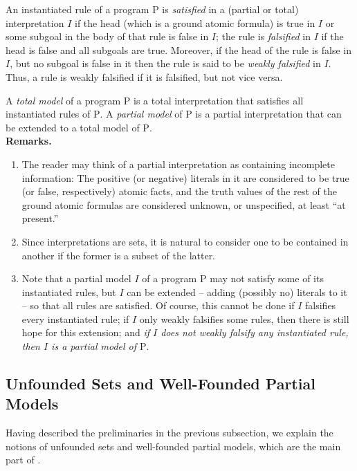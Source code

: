 An instantiated rule of a program $\mathrm{P}$ is \emph{satisfied} in a (partial or total) interpretation $I$ if the head (which is a ground atomic formula) is true in $I$ or some subgoal in the body of that rule is false in $I$; the rule is \emph{falsified} in $I$ if the head is false and all subgoals are true. Moreover, if the head of the rule is false in $I$, but no subgoal is false in it then the rule is said to be \emph{weakly falsified} in $I$. Thus, a rule is weakly falsified if it is falsified, but not vice versa.

A \emph{total model} of a program $\mathrm{P}$ is a total interpretation that satisfies all instantiated rules of $\mathrm{P}$. A \emph{partial model} of $\mathrm{P}$ is a partial interpretation that can be extended to a total model of $\mathrm{P}$.
\ \medskip\\
\noindent\textbf{Remarks.}
\begin{enumerate}[label=(\alph*)]
%
\item The reader may think of a partial interpretation as containing incomplete information: The positive (or negative) literals in it are considered to be true (or false, respectively) atomic facts, and the truth values of the rest of the ground atomic formulas are considered unknown, or unspecified, at least ``at present.''
%
\item Since interpretations are sets, it is natural to consider one to be contained in another if the former is a subset of the latter.
%
\item Note that a partial model $I$ of a program $\mathrm{P}$ may not satisfy some of its instantiated rules, but $I$ can be extended -- adding (possibly no) literals to it -- so that all rules are satisfied. Of course, this cannot be done if $I$ falsifies every instantiated rule; if $I$ only weakly falsifies some rules, then there is still hope for this extension; and \emph{if $I$ does not weakly falsify any instantiated rule, then $I$ is a partial model of $\mathrm{P}$}.
%
\end{enumerate}

\subsection{Unfounded Sets and Well-Founded Partial Models}
Having described the preliminaries in the previous subsection, we explain the notions of unfounded sets and well-founded partial models, which are the main part of \cite{VanGelder}.

